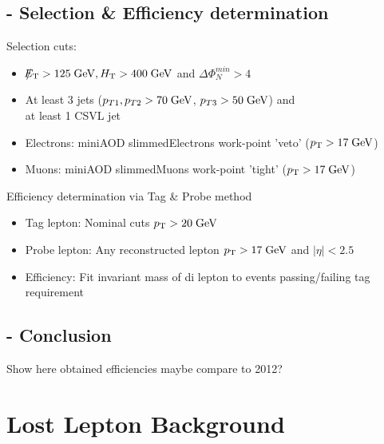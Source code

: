 \documentclass{beamer}
\begin{document}
\subsection{\Zll - Selection \& Efficiency determination}
\begin{frame}
Selection cuts:
\begin{itemize}
 \item $\slash\mkern-12mu{E}_{\text{T}} > 125 \;\text{Ge}\kern-0.06667em\text{V}, H_{\text{T}} > 400 \;\text{Ge}\kern-0.06667em\text{V} $ and $\Delta\Phi_{N}^{min}>4$
 \item At least 3 jets ($p_{T\text{1}},p_{T\text{2}} > 70\;\text{Ge}\kern-0.06667em\text{V}$, $p_{T\text{3}} > 50\;\text{Ge}\kern-0.06667em\text{V}$) and \\ at least 1 CSVL jet
 \item Electrons: miniAOD slimmedElectrons work-point 'veto' ($p_{\text{T}}>17\;\text{Ge}\kern-0.06667em\text{V}$)
 \item Muons: miniAOD slimmedMuons work-point 'tight' ($p_{\text{T}}>17\;\text{Ge}\kern-0.06667em\text{V}$)
\end{itemize}
Efficiency determination via Tag \& Probe method
\begin{itemize}
 \item Tag lepton: Nominal cuts $p_{\text{T}}>20\;\text{Ge}\kern-0.06667em\text{V}$
 \item Probe lepton: Any reconstructed lepton $p_{\text{T}}>17\;\text{Ge}\kern-0.06667em\text{V}$ and $|\eta|<2.5$
 \item Efficiency: Fit invariant mass of di lepton to events passing/failing tag requirement 
\end{itemize}
\end{frame}

\subsection{\Zll - Conclusion}
\begin{frame}
Show here obtained efficiencies maybe compare to 2012?
\end{frame}


\section{Lost Lepton Background }
\end{document}
